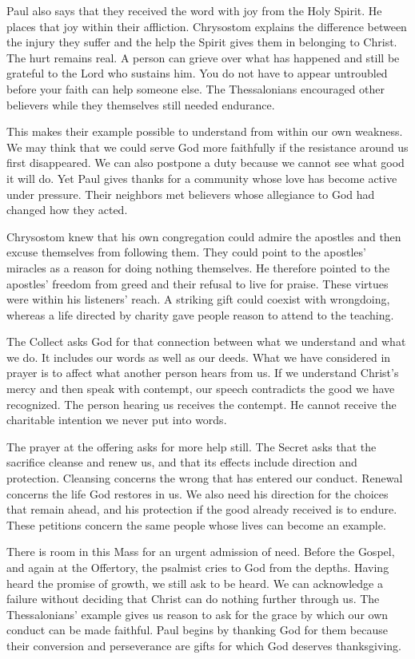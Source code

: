 Paul also says that they received the word with joy from the Holy Spirit. He places that joy within their affliction. Chrysostom explains the difference between the injury they suffer and the help the Spirit gives them in belonging to Christ. The hurt remains real. A person can grieve over what has happened and still be grateful to the Lord who sustains him. You do not have to appear untroubled before your faith can help someone else. The Thessalonians encouraged other believers while they themselves still needed endurance.

This makes their example possible to understand from within our own weakness. We may think that we could serve God more faithfully if the resistance around us first disappeared. We can also postpone a duty because we cannot see what good it will do. Yet Paul gives thanks for a community whose love has become active under pressure. Their neighbors met believers whose allegiance to God had changed how they acted.

Chrysostom knew that his own congregation could admire the apostles and then excuse themselves from following them. They could point to the apostles' miracles as a reason for doing nothing themselves. He therefore pointed to the apostles' freedom from greed and their refusal to live for praise. These virtues were within his listeners' reach. A striking gift could coexist with wrongdoing, whereas a life directed by charity gave people reason to attend to the teaching.

The Collect asks God for that connection between what we understand and what we do. It includes our words as well as our deeds. What we have considered in prayer is to affect what another person hears from us. If we understand Christ's mercy and then speak with contempt, our speech contradicts the good we have recognized. The person hearing us receives the contempt. He cannot receive the charitable intention we never put into words.

The prayer at the offering asks for more help still. The Secret asks that the sacrifice cleanse and renew us, and that its effects include direction and protection. Cleansing concerns the wrong that has entered our conduct. Renewal concerns the life God restores in us. We also need his direction for the choices that remain ahead, and his protection if the good already received is to endure. These petitions concern the same people whose lives can become an example.

There is room in this Mass for an urgent admission of need. Before the Gospel, and again at the Offertory, the psalmist cries to God from the depths. Having heard the promise of growth, we still ask to be heard. We can acknowledge a failure without deciding that Christ can do nothing further through us. The Thessalonians' example gives us reason to ask for the grace by which our own conduct can be made faithful. Paul begins by thanking God for them because their conversion and perseverance are gifts for which God deserves thanksgiving.

